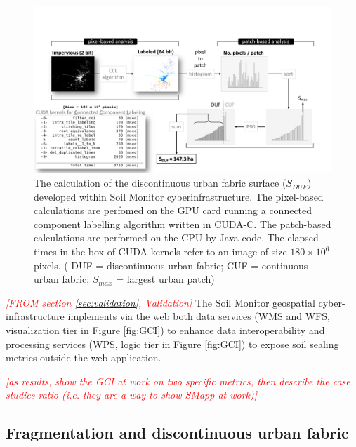 \documentclass[APA,LATO1COL,doublespace]{WileyNJD-v2}
\newcommand{\toberevised}[1]{\emph{\textcolor{red}{#1}}} %
\begin{document}
\begin{figure}[t] %
    \centerline{\includegraphics[width=500pt]{daMileti/03_DUF_explanation.pdf}}
    \caption{ The calculation of the discontinuous urban fabric surface ($S_{DUF}$) developed within Soil Monitor cyberinfrastructure. 
    The pixel-based calculations are perfomed on the GPU card running a connected component labelling algorithm written in CUDA-C. 
    The patch-based calculations are performed on the CPU by Java code.
    The elapsed times in the box of CUDA kernels  refer to an image of size $180 \times 10^6$ pixels.
    ( DUF = discontinuous urban fabric; CUF = continuous urban fabric; $S_{max}$ = largest urban patch)} \label{fig:ccl}
\end{figure}

\toberevised{[FROM section \ref{sec:validation}, Validation]}
The Soil Monitor geospatial cyber-infrastructure implements via the web both data services (WMS and WFS, visualization tier in Figure \ref{fig:GCI}) to enhance data interoperability and processing services (WPS, logic tier in Figure \ref{fig:GCI}) to expose soil sealing metrics outside the web application.


\toberevised{[as results, show the GCI at work on two specific metrics, then describe the case studies ratio (i.e. they are a way to show SMapp at work)]}

\subsection{ Fragmentation and discontinuous urban fabric }

\end{document}
